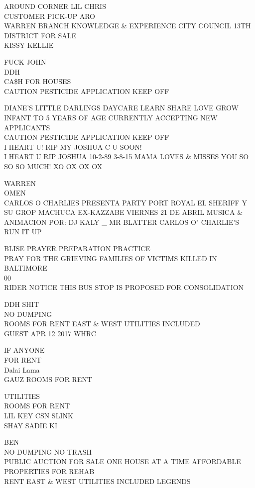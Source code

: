\documentclass[10pt,letterpaper]{article}
\begin{document}
AROUND CORNER LIL CHRIS\\
CUSTOMER PICK{-}UP ARO\\
WARREN BRANCH KNOWLEDGE \& EXPERIENCE CITY COUNCIL 13TH DISTRICT FOR SALE\\
KISSY KELLIE

FUCK JOHN\\
DDH\\
CA\$H FOR HOUSES\\
CAUTION PESTICIDE APPLICATION KEEP OFF

DIANE'S LITTLE DARLINGS DAYCARE LEARN SHARE LOVE GROW INFANT TO 5 YEARS OF AGE CURRENTLY ACCEPTING NEW APPLICANTS\\
CAUTION PESTICIDE APPLICATION KEEP OFF\\
I HEART U!  RIP MY JOSHUA C U SOON!\\
I HEART U RIP JOSHUA 10{-}2{-}89 3{-}8{-}15 MAMA LOVES \& MISSES YOU SO SO SO MUCH! XO OX OX OX

WARREN\\
OMEN\\
CARLOS O CHARLIES PRESENTA PARTY PORT ROYAL EL SHERIFF Y SU GROP MACHUCA EX{-}KAZZABE VIERNES 21 DE ABRIL MUSICA \& ANIMACION POR: DJ KALY \_ MR BLATTER CARLOS O" CHARLIE'S\\
RUN IT UP

BLISE PRAYER PREPARATION PRACTICE\\
PRAY FOR THE GRIEVING FAMILIES OF VICTIMS KILLED IN BALTIMORE\\
00\\
RIDER NOTICE THIS BUS STOP IS PROPOSED FOR CONSOLIDATION

DDH SHIT\\
NO DUMPING\\
ROOMS FOR RENT EAST \& WEST UTILITIES INCLUDED\\
GUEST APR 12 2017 WHRC

IF ANYONE\\
FOR RENT\\
Dalai Lama\\
GAUZ ROOMS FOR RENT

UTILITIES\\
ROOMS FOR RENT\\
LIL KEY CSN SLINK\\
SHAY SADIE KI

BEN\\
NO DUMPING NO TRASH\\
PUBLIC AUCTION FOR SALE ONE HOUSE AT A TIME AFFORDABLE PROPERTIES FOR REHAB\\
RENT EAST \& WEST UTILITIES INCLUDED LEGENDS
\end{document}
